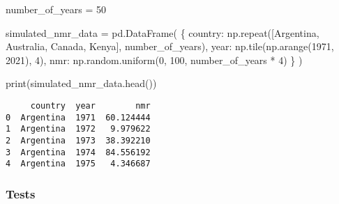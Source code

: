 \documentclass[
  letterpaper,
  DIV=11,
  numbers=noendperiod]{scrreprt}
\newenvironment{Shaded}{\begin{snugshade}}{\end{snugshade}}
\newcommand{\BuiltInTok}[1]{\textcolor[rgb]{0.00,0.23,0.31}{#1}}
\newcommand{\DecValTok}[1]{\textcolor[rgb]{0.68,0.00,0.00}{#1}}
\newcommand{\NormalTok}[1]{\textcolor[rgb]{0.00,0.23,0.31}{#1}}
\newcommand{\OperatorTok}[1]{\textcolor[rgb]{0.37,0.37,0.37}{#1}}
\newcommand{\StringTok}[1]{\textcolor[rgb]{0.13,0.47,0.30}{#1}}
\begin{document}
\begin{Shaded}
\begin{Highlighting}[]
\NormalTok{number\_of\_years }\OperatorTok{=} \DecValTok{50}

\NormalTok{simulated\_nmr\_data }\OperatorTok{=}\NormalTok{ pd.DataFrame(}
\NormalTok{    \{}
        \StringTok{\textquotesingle{}country\textquotesingle{}}\NormalTok{: np.repeat([}\StringTok{\textquotesingle{}Argentina\textquotesingle{}}\NormalTok{, }\StringTok{\textquotesingle{}Australia\textquotesingle{}}\NormalTok{, }\StringTok{\textquotesingle{}Canada\textquotesingle{}}\NormalTok{, }\StringTok{\textquotesingle{}Kenya\textquotesingle{}}\NormalTok{], number\_of\_years),}
        \StringTok{\textquotesingle{}year\textquotesingle{}}\NormalTok{: np.tile(np.arange(}\DecValTok{1971}\NormalTok{, }\DecValTok{2021}\NormalTok{), }\DecValTok{4}\NormalTok{),}
        \StringTok{\textquotesingle{}nmr\textquotesingle{}}\NormalTok{: np.random.uniform(}\DecValTok{0}\NormalTok{, }\DecValTok{100}\NormalTok{, number\_of\_years }\OperatorTok{*} \DecValTok{4}\NormalTok{)}
\NormalTok{    \}}
\NormalTok{)}

\BuiltInTok{print}\NormalTok{(simulated\_nmr\_data.head())}
\end{Highlighting}
\end{Shaded}

\begin{verbatim}
     country  year        nmr
0  Argentina  1971  60.124444
1  Argentina  1972   9.979622
2  Argentina  1973  38.392210
3  Argentina  1974  84.556192
4  Argentina  1975   4.346687
\end{verbatim}

\hypertarget{tests}{%
\subsubsection{Tests}\label{tests}}
\end{document}
